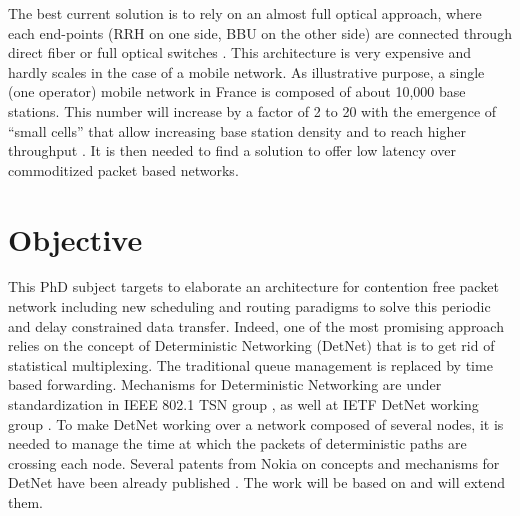 \documentclass{article}
\begin{document}
The best current solution is to rely on an almost full optical approach, where each end-points (RRH on one side, BBU on the other side) are connected through direct fiber or full optical switches \cite{5gppparchitecture}. This architecture is very expensive and hardly scales in the case of a mobile network. As illustrative purpose, a single (one operator) mobile network in France is composed of about 10,000 base stations. This number will increase by a factor of 2 to 20 with the emergence of “small cells” that allow increasing base station density and to reach higher throughput \cite{5gppparchitecture}. It is then needed to find a solution to offer low latency over commoditized packet based networks.\\ 

\section*{Objective}
This PhD subject targets to elaborate an architecture for contention free packet network including new scheduling and routing paradigms to solve this periodic and delay constrained data transfer. Indeed, one of the most promising approach relies on the concept of Deterministic Networking (DetNet) that is to get rid of statistical multiplexing. The traditional queue management is replaced by time based forwarding. Mechanisms for Deterministic Networking are under standardization in IEEE 802.1 TSN group \cite{ieee802}, as well at IETF DetNet working group \cite{finn-detnet-architecture-08}.  To make DetNet working over a network composed of several nodes, it is needed to manage the time at which the packets of deterministic paths are crossing each node. Several patents from Nokia on concepts and mechanisms for DetNet have been  already   published \cite{howe2005time,leclerc2015contention,leclerc2016signaling,leclerc2016transmission,roos1994method,coherentflow}. The work will be based on and will extend them.\\
\end{document}
